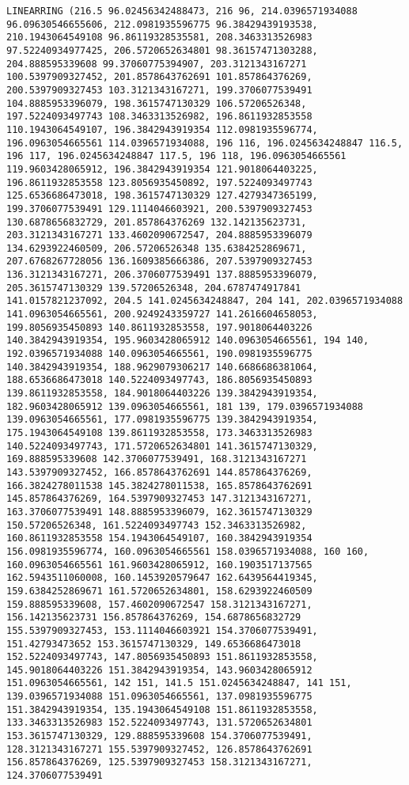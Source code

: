 \documentclass{article}
\begin{document}
\begin{Verbatim}[commandchars=\\\{\}]
LINEARRING (216.5 96.02456342488473, 216 96, 214.0396571934088 96.09630546655606, 212.0981935596775 96.38429439193538, 210.1943064549108 96.86119328535581, 208.3463313526983 97.52240934977425, 206.5720652634801 98.36157471303288, 204.888595339608 99.37060775394907, 203.3121343167271 100.5397909327452, 201.8578643762691 101.857864376269, 200.5397909327453 103.3121343167271, 199.3706077539491 104.8885953396079, 198.3615747130329 106.57206526348, 197.5224093497743 108.3463313526982, 196.8611932853558 110.1943064549107, 196.3842943919354 112.0981935596774, 196.0963054665561 114.0396571934088, 196 116, 196.0245634248847 116.5, 196 117, 196.0245634248847 117.5, 196 118, 196.0963054665561 119.9603428065912, 196.3842943919354 121.9018064403225, 196.8611932853558 123.8056935450892, 197.5224093497743 125.6536686473018, 198.3615747130329 127.4279347365199, 199.3706077539491 129.1114046603921, 200.5397909327453 130.6878656832729, 201.857864376269 132.142135623731, 203.3121343167271 133.4602090672547, 204.8885953396079 134.6293922460509, 206.57206526348 135.6384252869671, 207.6768267728056 136.1609385666386, 207.5397909327453 136.3121343167271, 206.3706077539491 137.8885953396079, 205.3615747130329 139.57206526348, 204.6787474917841 141.0157821237092, 204.5 141.0245634248847, 204 141, 202.0396571934088 141.0963054665561, 200.9249243359727 141.2616604658053, 199.8056935450893 140.8611932853558, 197.9018064403226 140.3842943919354, 195.9603428065912 140.0963054665561, 194 140, 192.0396571934088 140.0963054665561, 190.0981935596775 140.3842943919354, 188.9629079306217 140.6686686381064, 188.6536686473018 140.5224093497743, 186.8056935450893 139.8611932853558, 184.9018064403226 139.3842943919354, 182.9603428065912 139.0963054665561, 181 139, 179.0396571934088 139.0963054665561, 177.0981935596775 139.3842943919354, 175.1943064549108 139.8611932853558, 173.3463313526983 140.5224093497743, 171.5720652634801 141.3615747130329, 169.888595339608 142.3706077539491, 168.3121343167271 143.5397909327452, 166.8578643762691 144.857864376269, 166.3824278011538 145.3824278011538, 165.8578643762691 145.857864376269, 164.5397909327453 147.3121343167271, 163.3706077539491 148.8885953396079, 162.3615747130329 150.57206526348, 161.5224093497743 152.3463313526982, 160.8611932853558 154.1943064549107, 160.3842943919354 156.0981935596774, 160.0963054665561 158.0396571934088, 160 160, 160.0963054665561 161.9603428065912, 160.1903517137565 162.5943511060008, 160.1453920579647 162.6439564419345, 159.6384252869671 161.5720652634801, 158.6293922460509 159.888595339608, 157.4602090672547 158.3121343167271, 156.142135623731 156.857864376269, 154.6878656832729 155.5397909327453, 153.1114046603921 154.3706077539491, 151.42793473652 153.3615747130329, 149.6536686473018 152.5224093497743, 147.8056935450893 151.8611932853558, 145.9018064403226 151.3842943919354, 143.9603428065912 151.0963054665561, 142 151, 141.5 151.0245634248847, 141 151, 139.0396571934088 151.0963054665561, 137.0981935596775 151.3842943919354, 135.1943064549108 151.8611932853558, 133.3463313526983 152.5224093497743, 131.5720652634801 153.3615747130329, 129.888595339608 154.3706077539491, 128.3121343167271 155.5397909327452, 126.8578643762691 156.857864376269, 125.5397909327453 158.3121343167271, 124.3706077539491 
\end{Verbatim}
\end{document}

